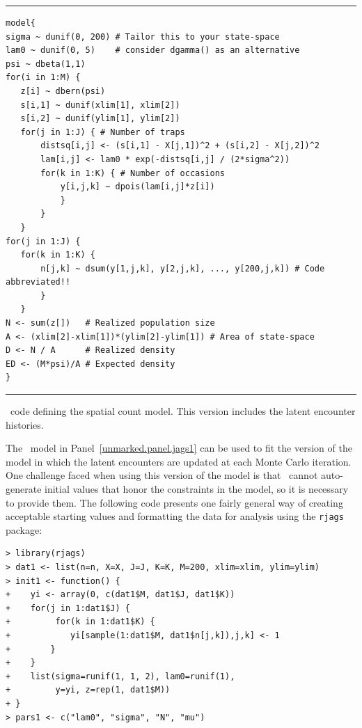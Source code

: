 \begin{panel}[ht]
\centering
\rule[0.05in]{\textwidth}{.03in}
\begin{small}
\begin{verbatim}
model{
sigma ~ dunif(0, 200) # Tailor this to your state-space
lam0 ~ dunif(0, 5)    # consider dgamma() as an alternative
psi ~ dbeta(1,1)
for(i in 1:M) {
   z[i] ~ dbern(psi)
   s[i,1] ~ dunif(xlim[1], xlim[2])
   s[i,2] ~ dunif(ylim[1], ylim[2])
   for(j in 1:J) { # Number of traps
       distsq[i,j] <- (s[i,1] - X[j,1])^2 + (s[i,2] - X[j,2])^2
       lam[i,j] <- lam0 * exp(-distsq[i,j] / (2*sigma^2))
       for(k in 1:K) { # Number of occasions
           y[i,j,k] ~ dpois(lam[i,j]*z[i])
           }
       }
   }
for(j in 1:J) {
   for(k in 1:K) {
       n[j,k] ~ dsum(y[1,j,k], y[2,j,k], ..., y[200,j,k]) # Code abbreviated!!
       }
   }
N <- sum(z[])   # Realized population size
A <- (xlim[2]-xlim[1])*(ylim[2]-ylim[1]) # Area of state-space
D <- N / A      # Realized density
ED <- (M*psi)/A # Expected density
}
\end{verbatim}
\end{small}
\rule[0.15in]{\textwidth}{.03in}
\caption{\jags~code defining the spatial count model. This version
  includes the latent encounter histories.}
\label{unmarked.panel.jags1}
\end{panel}

The \jags~model in Panel~\ref{unmarked.panel.jags1} can be used to
fit the version of the model in which the latent encounters are
updated at each Monte Carlo iteration. One challenge faced when using
this version of the model is that \jags~cannot auto-generate initial values
that honor the constraints in the model, so it is necessary to provide
them. The following code presents one fairly general way of creating
acceptable starting values and formatting the data for analysis using
the \texttt{rjags} package:
\begin{small}
\begin{verbatim}
> library(rjags)
> dat1 <- list(n=n, X=X, J=J, K=K, M=200, xlim=xlim, ylim=ylim)
> init1 <- function() {
+    yi <- array(0, c(dat1$M, dat1$J, dat1$K))
+    for(j in 1:dat1$J) {
+         for(k in 1:dat1$K) {
+            yi[sample(1:dat1$M, dat1$n[j,k]),j,k] <- 1
+        }
+    }
+    list(sigma=runif(1, 1, 2), lam0=runif(1),
+         y=yi, z=rep(1, dat1$M))
+ }
> pars1 <- c("lam0", "sigma", "N", "mu")
\end{verbatim}
\end{small}

